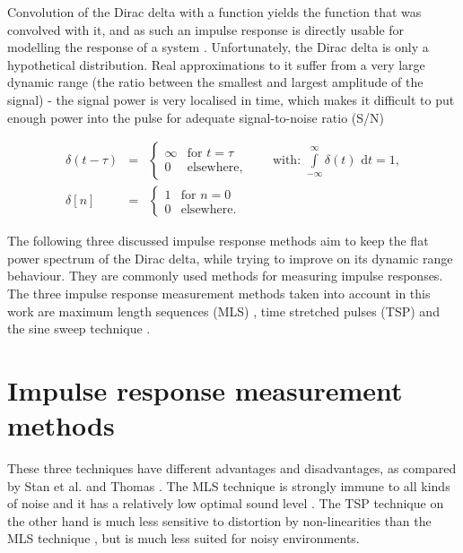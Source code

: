Convolution of the Dirac delta with a function yields the function that was convolved with it, and as such an impulse response is directly usable for modelling the response of a system \cite[p.~169-171]{girod2001signals}.
Unfortunately, the Dirac delta is only a hypothetical distribution.
Real approximations to it suffer from a very large dynamic range (the ratio between the smallest and largest amplitude of the signal) - the signal power is very localised in time, which makes it difficult to put enough power into the pulse for adequate signal-to-noise ratio (S/N) \cite{hee2003}

\begin{eqnarray}
\label{eq:delta}\delta(t-\tau)&=&\left\{\begin{array}{cl}
\infty&\text{for }t=\tau\\
0&\text{elsewhere,}
\end{array}\right.\qquad\text{with: }\int\limits_{-\infty}^\infty\delta(t)\text{ d}t=1,\\
\label{eq:delta_dig}\delta[n]&=&\left\{\begin{array}{cl}
1&\text{for }n=0\\
0&\text{elsewhere.}
\end{array}\right.
\end{eqnarray}

The following three discussed impulse response methods aim to keep the flat power spectrum of the Dirac delta, while trying to improve on its dynamic range behaviour. 
They are commonly used methods for measuring impulse responses.
The three impulse response measurement methods taken into account in this work are maximum length sequences (MLS) \cite{hee2003}, time stretched pulses (TSP) \cite{Aoshima19811484} and the sine sweep technique \cite{Stan2002249}. 

\section{Impulse response measurement methods}
These three techniques have different advantages and disadvantages, as compared by Stan et al. \cite{Stan2002249} and Thomas \cite{Thomas2006}.
The MLS technique is strongly immune to all kinds of noise and it has a relatively low optimal sound level \cite{Stan2002249}.
The TSP technique on the other hand is much less sensitive to distortion by non-linearities than the MLS technique \cite{Stan2002249}, but is much less suited for noisy environments.

